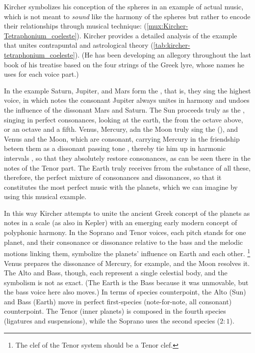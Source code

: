 Kircher symbolizes his conception of the spheres in an example of actual music,
which is not meant to \emph{sound} like the harmony of the spheres but rather to
encode their relationships through musical technique:
 (\cref{mux:Kircher-Tetraphonium_coeleste}).%
\citXXX[Ibid 384]
Kircher provides a detailed analysis of the example that unites contrapuntal and
astrological theory (\cref{tab:kircher-tetraphonium_coeleste}).
(He has been developing an allegory throughout the last book of
his treatise based on the four strings of the Greek lyre, whose
names he uses for each voice part.)
\begin{quoting}
	In the example Saturn, Jupiter, and Mars form the , that
	is, they sing the highest voice, in which notes the consonant Jupiter
	always unites in harmony  and undoes the influence of
	 the dissonant Mars and Saturn.
	The Sun proceeds truly as the  , singing in
	perfect consonances, looking at the earth, the 
	 from the octave above, or an octave and a fifth.
	Venus, Mercury, adn the Moon truly sing the 
	(), and Venus and the Moon, which are consonant, carrying
	Mercury in the friendship beteen them as a dissonant passing tone
	, thereby tie him up in harmonic
	intervals , so that they absolutely restore
	consonances, as can be seen there in the notes of the Tenor part.
	The Earth truly receives frrom the substance of all these, therefore,
	the perfect mixture of consonances and dissonances, so that it
        constitutes the most perfect music with the planets, which we can
        imagine by using this musical example.%
	\citXXX[Kircher II:383-384]
\end{quoting}
In this way Kircher attempts to unite the ancient Greek concept of the planets
as notes in a scale (as also in Kepler) with an emerging early modern concept of
polyphonic harmony.
In the Soprano and Tenor voices, each pitch stands for one planet, and their
consonance or dissonance relative to the bass and the melodic motions linking
them, symbolize the planets' influence on Earth and each other.%
	\footnote{The clef of the Tenor system should be a Tenor clef.}
Venus prepares the dissonance of Mercury, for example, and the Moon resolves it.
The Alto and Bass, though, each represent a single celestial body, and the
symbolism is not as exact.
(The Earth is the Bass because it was unmovable, but the bass voice here also
moves.)
In terms of species counterpoint, the Alto (Sun) and Bass (Earth) move in
perfect first-species (note-for-note, all consonant) counterpoint.%
The Tenor (inner planets) is composed in the fourth species (ligatures and
suspensions), while the Soprano uses the second species ($2:1$).

